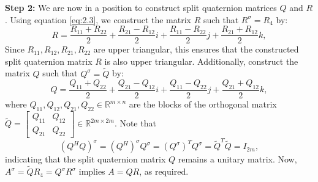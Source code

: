 \documentclass[12pt]{article}
\numberwithin{equation}{section}
\begin{document}
\noindent \textbf{Step 2:} We are now in a position to construct split quaternion matrices $Q$ and $R$.
Using equation \eqref{eq:2.3}, we construct the matrix $R$ such that $R^\sigma=R_4$ by:
\begin{equation*}
R = \frac{R_{11} + R_{22}}{2} + \frac{R_{21} - R_{12}}{2}i + \frac{R_{11} - R_{22}}{2}j + \frac{R_{21} + R_{12}}{2}k,
\end{equation*}
Since $R_{11}, R_{12}, R_{21}, R_{22}$ are upper triangular, this ensures that the constructed split quaternion matrix $R$ is also upper triangular. Additionally, construct the matrix $Q$ such that $Q^\sigma=\widetilde{Q}$ by:
\begin{equation*}
Q = \frac{Q_{11} + Q_{22}}{2} + \frac{Q_{21} - Q_{12}}{2}i + \frac{Q_{11} - Q_{22}}{2}j + \frac{Q_{21} + Q_{12}}{2}k,
\end{equation*}
where $Q_{11}, Q_{12}, Q_{21}, Q_{22} \in \mathbb{R}^{m \times n}$ are the blocks of the orthogonal matrix $\widetilde{Q} = \begin{bmatrix} Q_{11} & Q_{12} \\ Q_{21} & Q_{22} \end{bmatrix} \in \mathbb{R}^{2m \times 2m}$. Note that \[(Q^H Q)^\sigma = {(Q^H)}^\sigma Q^\sigma = {(Q^\sigma)}^TQ^\sigma = \widetilde{Q}^T\widetilde{Q} = I_{2m},\] indicating that the split quaternion matrix $Q$ remains a unitary matrix.
Now, $A^\sigma=\widetilde{Q}R_4=Q^\sigma R^\sigma$ implies
$A = Q R$, as required.
 
\end{document}
